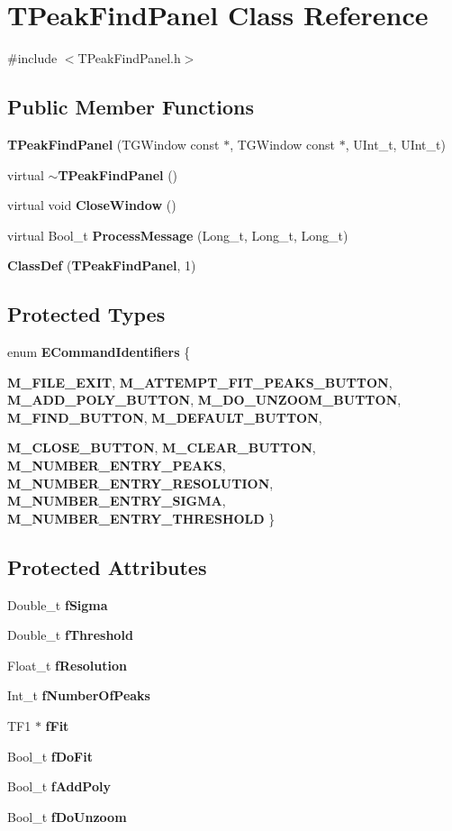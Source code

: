\section{TPeakFindPanel Class Reference}
\label{classTPeakFindPanel}


{\ttfamily \#include $<$TPeakFindPanel.h$>$}\subsection*{Public Member Functions}
\begin{DoxyCompactItemize}
\item 
{\bf TPeakFindPanel} (TGWindow const $\ast$, TGWindow const $\ast$, UInt\_\-t, UInt\_\-t)
\item 
virtual {\bf $\sim$TPeakFindPanel} ()
\item 
virtual void {\bf CloseWindow} ()
\item 
virtual Bool\_\-t {\bf ProcessMessage} (Long\_\-t, Long\_\-t, Long\_\-t)
\item 
{\bf ClassDef} ({\bf TPeakFindPanel}, 1)
\end{DoxyCompactItemize}
\subsection*{Protected Types}
\begin{DoxyCompactItemize}
\item 
enum {\bf ECommandIdentifiers} \{ \par
{\bf M\_\-FILE\_\-EXIT}, 
{\bf M\_\-ATTEMPT\_\-FIT\_\-PEAKS\_\-BUTTON}, 
{\bf M\_\-ADD\_\-POLY\_\-BUTTON}, 
{\bf M\_\-DO\_\-UNZOOM\_\-BUTTON}, 
{\bf M\_\-FIND\_\-BUTTON}, 
{\bf M\_\-DEFAULT\_\-BUTTON}, 
\par
{\bf M\_\-CLOSE\_\-BUTTON}, 
{\bf M\_\-CLEAR\_\-BUTTON}, 
{\bf M\_\-NUMBER\_\-ENTRY\_\-PEAKS}, 
{\bf M\_\-NUMBER\_\-ENTRY\_\-RESOLUTION}, 
{\bf M\_\-NUMBER\_\-ENTRY\_\-SIGMA}, 
{\bf M\_\-NUMBER\_\-ENTRY\_\-THRESHOLD}
 \}
\end{DoxyCompactItemize}
\subsection*{Protected Attributes}
\begin{DoxyCompactItemize}
\item 
Double\_\-t {\bf fSigma}
\item 
Double\_\-t {\bf fThreshold}
\item 
Float\_\-t {\bf fResolution}
\item 
Int\_\-t {\bf fNumberOfPeaks}
\item 
TF1 $\ast$ {\bf fFit}
\item 
Bool\_\-t {\bf fDoFit}
\item 
Bool\_\-t {\bf fAddPoly}
\item 
Bool\_\-t {\bf fDoUnzoom}
\end{DoxyCompactItemize}
